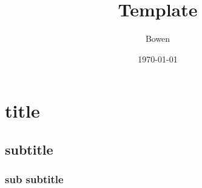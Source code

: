 \documentclass[a4paper,12pt]{article}
\begin{document}
    \title{Template}
    \author{Bowen}
    \date{\today}
    \maketitle


    \section{title}

    \subsection{subtitle}

    \subsubsection{sub subtitle}
\end{document}
